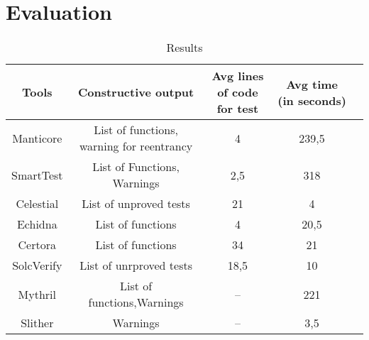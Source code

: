 
\chapter{Evaluation}
\label{ch:Evaluation}


\begin{table*}
    \footnotesize
    \caption{Results}
    \label{tab:Results}
    \begin{tabular}{ccccl}
    \toprule
     Tools  & Constructive output &  Avg lines of code for test & Avg time (in seconds) \\
      \midrule
        Manticore & List of functions, warning for reentrancy  & 4  &  239,5 \\
        SmartTest & List of Functions, Warnings  & 2,5 &  318  \\
        Celestial & List of unproved tests & 21  &  4  \\
        Echidna & List of functions  & 4  & 20,5 \\
        Certora & List of functions   & 34 &  21  \\ 
        SolcVerify & List of unrproved tests  &  18,5 &  10  \\
        Mythril & List of functions,Warnings  & --  &  221  \\ 
        Slither& Warnings & --  &  3,5  \\ 
    \bottomrule
    \end{tabular}
\end{table*}

